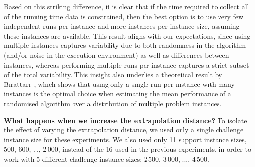\documentclass[aic]{iosart2x}
\begin{document}
Based on this striking difference, it is clear that if the time required to collect all of the running time data is constrained, then the best option is to use very few independent runs per instance and more instances per instance size, assuming these instances are available. This result aligns with our expectations, since using multiple instances captures variability due to both randomness in the algorithm (and/or noise in the execution environment) as well as differences between instances, whereas performing multiple runs per instance captures a strict subset of the total variability. This insight also underlies a theoretical result by Birattari~\cite{Bir04}, which shows that using only a single run per instance with many instances is the optimal choice when estimating the mean performance of a randomised algorithm over a distribution of multiple problem instances. 

\textbf{What happens when we increase the extrapolation distance?}
To isolate the effect of varying the extrapolation distance, we used only a single challenge instance size for these experiments. 
We also used only 11 support instance sizes, 500, 600, ..., 2\,000, instead of the 16 used in the previous experiments, in order to work with 5 different challenge instance sizes: 2\,500, 3\,000, ..., 4\,500.
\end{document}
